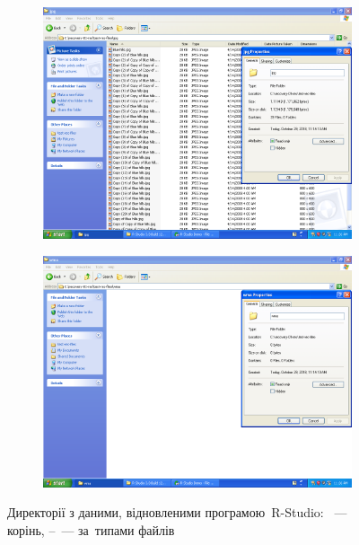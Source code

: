 \documentclass[
	a4paper,
	oneside,
	DIV = 12,
	fontsize = 13pt,
	headings = normal,
]{scrartcl}
\begin{document}
\begin{figure}
\begin{subfigure}{0.5\columnwidth}
				\includegraphics[height = 9\baselineskip]{./assets/y03s01-pcdiag-lab-03-p09.png}
				\caption{}
				\label{subfig:03-03-dll}
			\end{subfigure}%
			\begin{subfigure}{0.5\columnwidth}
				\centering
				\includegraphics[height = 9\baselineskip]{./assets/y03s01-pcdiag-lab-03-p10.png}
				\caption{}
				\label{subfig:03-04-wav}
			\end{subfigure}%
			\caption{Директорії з даними, відновленими програмою~\textenglish{R-Studio}: ~— корінь, –~— за~типами файлів}
			\label{fig:03-rstudio-recovery-res}
		\end{figure}
\end{document}
